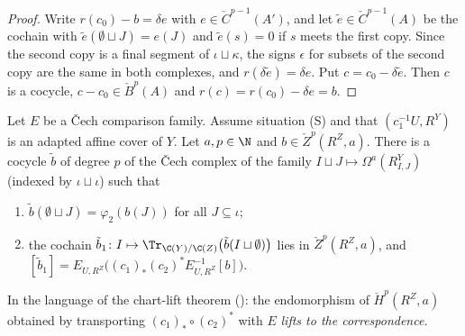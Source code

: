 \begin{proof}
Write $r(c_0)-b=\delta e$ with $e\in\check C^{p-1}(A')$, and let $\tilde e\in\check C^{p-1}(A)$ be the cochain with $\tilde e(\emptyset\sqcup J)=e(J)$ and
$\tilde e(s)=0$ if $s$ meets the first copy. Since the second copy is a final segment of $\iota\sqcup\kappa$, the signs $\epsilon$ for subsets of
the second copy are the same in both complexes, and $r(\delta\tilde e)=\delta e$. Put $c=c_0-\delta\tilde e$. Then $c$ is a cocycle,
$c-c_0\in\check B^p(A)$ and $r(c)=r(c_0)-\delta e=b$.
\end{proof}

\begin{theorem}\label{pf:hlf-cech:familythm}
Let $E$ be a \v{C}ech comparison family. Assume situation (S) and that $(c_1^{-1}U,R^Y)$ is an adapted affine cover of $Y$. Let $a,p\in\N$ and
$b\in\check Z^p(R^Z,a)$. There is a cocycle $\tilde b$ of degree $p$ of the \v{C}ech complex of the family $I\sqcup J\mapsto\Omega^a(R^Y_{I,J})$ (indexed
by $\iota\sqcup\iota$) such that
\begin{enumerate}[label=(\arabic*),nosep]
\item $\tilde b(\emptyset\sqcup J)=\varphi_2(b(J))$ for all $J\subseteq\iota$;
\item the cochain $\tilde b_1\colon I\mapsto\Tr_{\C(Y)/\C(Z)}\bigl(\tilde b(I\sqcup\emptyset)\bigr)$ lies in $\check Z^p(R^Z,a)$, and
  $[\tilde b_1]=E_{U,R^Z}\bigl((c_1)_*(c_2)^*E_{U,R^Z}^{-1}[b]\bigr)$.
\end{enumerate}
\end{theorem}

In the language of the chart-lift theorem (): the endomorphism of $\check H^p(R^Z,a)$
obtained by transporting $(c_1)_*\circ(c_2)^*$ with $E$ \emph{lifts to the correspondence}.

